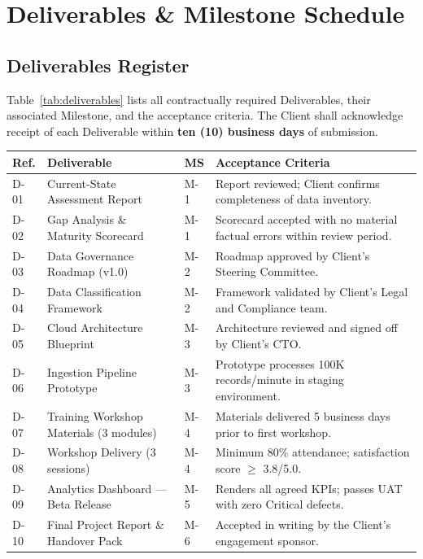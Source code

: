 
\section{Deliverables \& Milestone Schedule}
\label{sec:deliverables}

\subsection{Deliverables Register}

Table~\ref{tab:deliverables} lists all contractually required Deliverables, their
associated Milestone, and the acceptance criteria. The Client shall acknowledge receipt
of each Deliverable within \textbf{ten (10) business days} of submission.

\vspace{6pt}
\begingroup\small
{}
\begin{tabularx}{\textwidth}{@{} L{0.9cm} L{4.0cm} C{1.5cm} X @{}}
  \toprule
  \color{white}\bfseries Ref. &
  \color{white}\bfseries Deliverable &
  \color{white}\bfseries MS &
  \color{white}\bfseries Acceptance Criteria \\
  \midrule
  D-01 & Current-State Assessment Report & M-1 &
    Report reviewed; Client confirms completeness of data inventory. \\
  D-02 & Gap Analysis \& Maturity Scorecard & M-1 &
    Scorecard accepted with no material factual errors within review period. \\
  D-03 & Data Governance Roadmap (v1.0) & M-2 &
    Roadmap approved by Client's Steering Committee. \\
  D-04 & Data Classification Framework & M-2 &
    Framework validated by Client's Legal and Compliance team. \\
  D-05 & Cloud Architecture Blueprint & M-3 &
    Architecture reviewed and signed off by Client's CTO. \\
  D-06 & Ingestion Pipeline Prototype & M-3 &
    Prototype processes 100K records/minute in staging environment. \\
  D-07 & Training Workshop Materials (3 modules) & M-4 &
    Materials delivered 5 business days prior to first workshop. \\
  D-08 & Workshop Delivery (3 sessions) & M-4 &
    Minimum 80\% attendance; satisfaction score $\geq$ 3.8/5.0. \\
  D-09 & Analytics Dashboard --- Beta Release & M-5 &
    Renders all agreed KPIs; passes UAT with zero Critical defects. \\
  D-10 & Final Project Report \& Handover Pack & M-6 &
    Accepted in writing by the Client's engagement sponsor. \\
  \bottomrule
\end{tabularx}
\endgroup
{}
\label{tab:deliverables}


